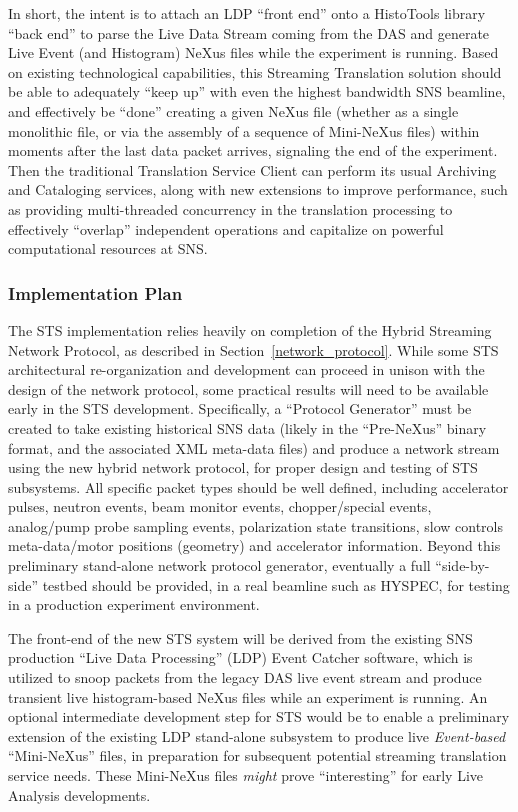 In short, the intent is to attach an LDP ``front end'' onto a HistoTools
library ``back end'' to parse the Live Data Stream coming from the DAS and
generate Live Event (and Histogram) NeXus files while the experiment is
running. Based on existing technological capabilities, this Streaming
Translation solution should be able to adequately ``keep up'' with even the
highest bandwidth SNS beamline, and effectively be ``done'' creating a given
NeXus file (whether as a single monolithic file, or via the assembly of a
sequence of Mini-NeXus files) within moments after the last data packet
arrives, signaling the end of the experiment. Then the traditional Translation
Service Client can perform its usual Archiving and Cataloging services, along
with new extensions to improve performance, such as providing multi-threaded
concurrency in the translation processing to effectively ``overlap'' independent
operations and capitalize on powerful computational resources at SNS.

\subsubsection{Implementation Plan}

The STS implementation relies heavily on completion of the
Hybrid Streaming Network Protocol,
as described in Section~\ref{network_protocol}.
While some STS architectural re-organization and development can proceed
in unison with the design of the network protocol,
some practical results will need to be available early
in the STS development.
Specifically, a ``Protocol Generator'' must be created to take existing
historical SNS data (likely in the ``Pre-NeXus'' binary format, and the
associated XML meta-data files) and produce a network stream using
the new hybrid network protocol,
for proper design and testing of STS subsystems.
All specific packet types should be well defined,
including accelerator pulses, neutron events, beam monitor events,
chopper/special events, analog/pump probe sampling events,
polarization state transitions, slow controls meta-data/motor positions
(geometry) and accelerator information.
Beyond this preliminary stand-alone network protocol generator,
eventually a full ``side-by-side'' testbed should be provided,
in a real beamline such as HYSPEC, for testing in a production
experiment environment.

The front-end of the new STS system will be derived from the
existing SNS production ``Live Data Processing'' (LDP)
Event Catcher software,
which is utilized to snoop packets from the legacy DAS live event stream
and produce transient live histogram-based NeXus files
while an experiment is running.
An optional intermediate development step for STS would be to enable a
preliminary extension of the existing LDP stand-alone subsystem to produce
live {\em Event-based} ``Mini-NeXus'' files,
in preparation for subsequent potential streaming translation service needs.
These Mini-NeXus files {\em might} prove ``interesting''
for early Live Analysis developments.

